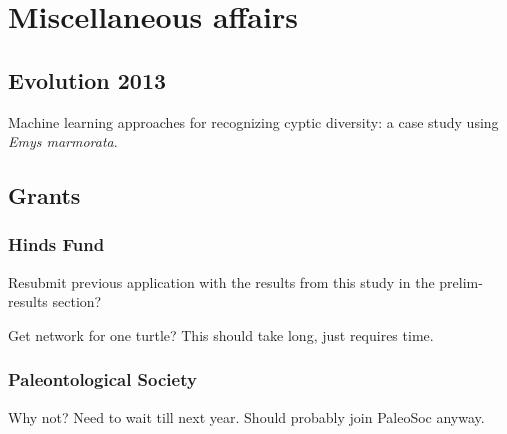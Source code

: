 \documentclass{article}\usepackage{graphicx, color}
\begin{document}
\section{Miscellaneous affairs}
\subsection{Evolution 2013}
Machine learning approaches for recognizing cyptic diversity: a case study using \textit{Emys marmorata}.

\subsection{Grants}
\subsubsection{Hinds Fund}
Resubmit previous application with the results from this study in the prelim-results section?

Get network for one turtle? This should take long, just requires time.

\subsubsection{Paleontological Society}
Why not? Need to wait till next year. Should probably join PaleoSoc anyway.
\end{document}
